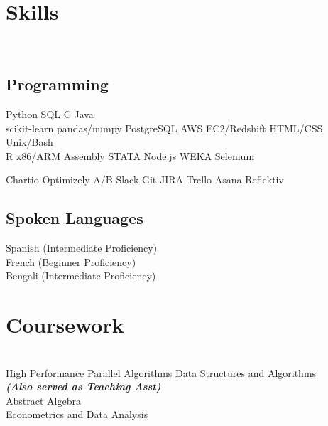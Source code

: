\documentclass[]{deedy-resume-openfont}
\begin{document}
\begin{minipage}[t]{0.33\textwidth}

\section{Skills}
\\[1\baselineskip]
\subsection{Programming}

Python \textbullet{}  SQL  \textbullet{} C \textbullet{} Java
\\[1\baselineskip]

scikit-learn \textbullet{} 
pandas/numpy
PostgreSQL \textbullet{} 
AWS EC2/Redshift \textbullet{}
HTML/CSS \textbullet{}
Unix/Bash
\\[1\baselineskip]

R \textbullet{} 
x86/ARM Assembly \textbullet{} 
STATA \textbullet{} 
Node.js \textbullet{} 
WEKA \textbullet{} 
Selenium
\sectionsep

Chartio \textbullet{} 
Optimizely A/B \textbullet{} 
Slack \textbullet{} 
Git \textbullet{} 
JIRA \textbullet{} 
Trello \textbullet{} 
Asana \textbullet{} 
Reflektiv
\sectionsep

\subsection{Spoken Languages}
Spanish (Intermediate Proficiency) \\
French (Beginner Proficiency)\\
Bengali (Intermediate Proficiency)\\
[1\baselineskip]


\section{Coursework}
\\[1\baselineskip]
High Performance Parallel Algorithms
Data Structures and Algorithms\\
{\footnotesize \textit{\textbf{(Also served as Teaching Asst) }}} \\
Abstract Algebra\\
Econometrics and Data Analysis\\
\sectionsep



%
%

\end{minipage} 
\end{document}

